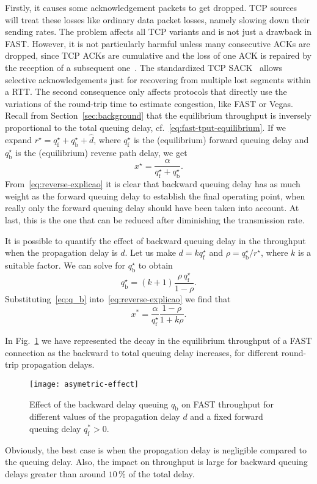 \documentclass[english,times]{ettauth}
\begin{document}
Firstly, it causes some acknowledgement packets to get dropped. TCP sources
will treat these losses like ordinary data packet losses, namely slowing down
their sending rates. The problem affects all TCP variants and is not just a
drawback in FAST. However, it is not particularly harmful unless many
consecutive ACKs are dropped, since TCP ACKs are cumulative and the loss of
one ACK is repaired by the reception of a subsequent one~\cite{Fu03}. The
standardized TCP SACK~\cite{rfc2018} allows selective acknowledgements just
for recovering from multiple lost segments within a RTT. The second
consequence only affects protocols that directly use the variations of the
round-trip time to estimate congestion, like FAST or Vegas. Recall from
Section~\ref{sec:background} that the equilibrium throughput is inversely
proportional to the total queuing delay, cf.~\eqref{eq:fast-tput-equilibrium}.
If we expand $r^\star = q_{\mathrm{f}}^\star + q_{\mathrm{b}}^\star + \hat d$,
where $q^\star_{\mathrm{f}}$ is the (equilibrium) forward queuing delay and
$q^\star_{\mathrm{b}}$ is the (equilibrium) reverse path delay, we get
\begin{equation}
  \label{eq:reverse-explicao}
  x ^\star = \frac{\alpha}{q_{\mathrm{f}}^\star +q_{\mathrm{b}}^\star}.
\end{equation}
From~\eqref{eq:reverse-explicao} it is clear that backward queuing delay has
as much weight as the forward queuing delay to establish the final operating
point, when really only the forward queuing delay should have been taken into
account. At last, this is the one that can be reduced after diminishing the
transmission rate.

It is possible to quantify the effect of backward queuing delay in the
throughput when the propagation delay is $d$. Let us make $d = k
q^\star_\mathrm{f}$ and $\rho = q^\star_{\mathrm{b}} / r^\star$, where $k$ is
a suitable factor. We can solve for $q^\star_{\mathrm{b}}$ to obtain
\begin{equation}
  \label{eq:q_b}
  q^\star_{\mathrm{b}} = (k+1) \frac{\rho\,q^\star_{\mathrm{f}}}{1 - \rho}.
\end{equation}
Substituting~\eqref{eq:q_b} into~\eqref{eq:reverse-explicao} we find that
\begin{equation}
  \label{eq:effect-reverse-final}
  x^* = \frac{\alpha}{q^\star_{\mathrm{f}}} \frac{1 - \rho}{1 + k\rho}.
\end{equation}

In Fig.~\ref{fig:asymetric-effect} we have represented the decay in the
equilibrium throughput of a FAST connection as the backward to total queuing
delay increases, for different round-trip propagation delays.
\begin{figure}
  \centering
  \texttt{[image: asymetric-effect]}
  \caption{Effect of the backward delay queuing $q_\mathrm b$ on FAST
    throughput for different values of the propagation delay $d$ and a fixed
    forward queuing delay $q_\mathrm f^* > 0$.}
  \label{fig:asymetric-effect}
\end{figure}
Obviously, the best case is when the propagation delay is negligible compared
to the queuing delay. Also, the impact on throughput is large for backward
queuing delays greater than around $10\,\%$ of the total delay.
\end{document}
